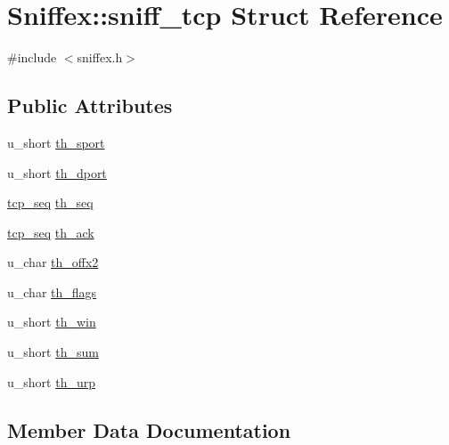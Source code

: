 \hypertarget{structSniffex_1_1sniff__tcp}{}\section{Sniffex\+:\+:sniff\+\_\+tcp Struct Reference}
\label{structSniffex_1_1sniff__tcp}


{\ttfamily \#include $<$sniffex.\+h$>$}

\subsection*{Public Attributes}
\begin{DoxyCompactItemize}
\item 
u\+\_\+short \mbox{\hyperlink{structSniffex_1_1sniff__tcp_a3cbc5a34aaffbb66d2e37060bd2ea9b6}{th\+\_\+sport}}
\item 
u\+\_\+short \mbox{\hyperlink{structSniffex_1_1sniff__tcp_a98f86dbef1d01db2bd032e1fe99342eb}{th\+\_\+dport}}
\item 
\mbox{\hyperlink{classSniffex_a83629f6a3ec687dd2bb381e9bf157d4f}{tcp\+\_\+seq}} \mbox{\hyperlink{structSniffex_1_1sniff__tcp_a7adabab3aaed105f0e075d3ce9ad523d}{th\+\_\+seq}}
\item 
\mbox{\hyperlink{classSniffex_a83629f6a3ec687dd2bb381e9bf157d4f}{tcp\+\_\+seq}} \mbox{\hyperlink{structSniffex_1_1sniff__tcp_a3c946baf5941e2e12af8b56a2570eece}{th\+\_\+ack}}
\item 
u\+\_\+char \mbox{\hyperlink{structSniffex_1_1sniff__tcp_a27045544602ef965e5a50025f42fbd1d}{th\+\_\+offx2}}
\item 
u\+\_\+char \mbox{\hyperlink{structSniffex_1_1sniff__tcp_a2bef60aa797ee914836f6b0007dc3ebb}{th\+\_\+flags}}
\item 
u\+\_\+short \mbox{\hyperlink{structSniffex_1_1sniff__tcp_aa8b7d8b1967e81a255ec9362f681c721}{th\+\_\+win}}
\item 
u\+\_\+short \mbox{\hyperlink{structSniffex_1_1sniff__tcp_a69830e35f22fcd1b9051afbd4e633fc0}{th\+\_\+sum}}
\item 
u\+\_\+short \mbox{\hyperlink{structSniffex_1_1sniff__tcp_a9f030cb6718b8d828f242d0464560761}{th\+\_\+urp}}
\end{DoxyCompactItemize}


\subsection{Member Data Documentation}
\mbox{\label{structSniffex_1_1sniff__tcp_a3c946baf5941e2e12af8b56a2570eece}} 
